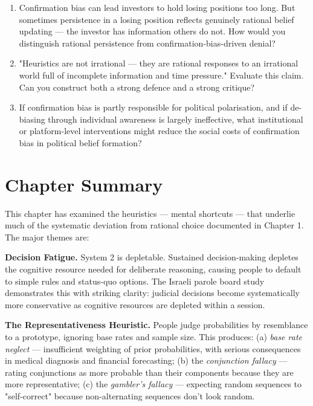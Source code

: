 \documentclass[12pt, letterpaper]{article}
\begin{document}
\begin{enumerate}
\item Confirmation bias can lead investors to hold losing positions too long. But sometimes persistence in a losing position reflects genuinely rational belief updating --- the investor has information others do not. How would you distinguish rational persistence from confirmation-bias-driven denial?

\item "Heuristics are not irrational --- they are rational responses to an irrational world full of incomplete information and time pressure." Evaluate this claim. Can you construct both a strong defence and a strong critique?

\item If confirmation bias is partly responsible for political polarisation, and if de-biasing through individual awareness is largely ineffective, what institutional or platform-level interventions might reduce the social costs of confirmation bias in political belief formation?
\end{enumerate}

\newpage


\section*{Chapter Summary}


This chapter has examined the heuristics --- mental shortcuts --- that underlie much of the systematic deviation from rational choice documented in Chapter 1. The major themes are:

\textbf{Decision Fatigue.} System 2 is depletable. Sustained decision-making depletes the cognitive resource needed for deliberate reasoning, causing people to default to simple rules and status-quo options. The Israeli parole board study demonstrates this with striking clarity: judicial decisions become systematically more conservative as cognitive resources are depleted within a session.

\textbf{The Representativeness Heuristic.} People judge probabilities by resemblance to a prototype, ignoring base rates and sample size. This produces: (a) \textit{base rate neglect} --- insufficient weighting of prior probabilities, with serious consequences in medical diagnosis and financial forecasting; (b) the \textit{conjunction fallacy} --- rating conjunctions as more probable than their components because they are more representative; (c) the \textit{gambler's fallacy} --- expecting random sequences to "self-correct" because non-alternating sequences don't look random.
\end{document}
